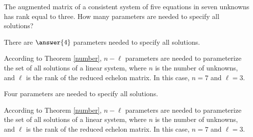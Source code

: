 \documentclass{ximera}
\begin{document}
\begin{exercise} \label{c2.4.2}
The augmented matrix of a consistent system of five equations in seven
unknowns has rank equal to three.  How many parameters are needed to
specify all solutions?
\begin{prompt}
  There are $\answer{4}$ parameters needed to specify all solutions.
\end{prompt}
\begin{hint}
  According to Theorem \ref{number}, $n - \ell$
parameters are needed to parameterize the set of all solutions of a
linear system, where $n$ is the number of unknowns, and $\ell$ is the
rank of the reduced echelon matrix.  In this case, $n = 7$ and $\ell =
3$.
\end{hint}

\begin{solution}

\ans Four parameters are needed to specify all solutions.

\soln According to Theorem \ref{number}, $n - \ell$
parameters are needed to parameterize the set of all solutions of a
linear system, where $n$ is the number of unknowns, and $\ell$ is the
rank of the reduced echelon matrix.  In this case, $n = 7$ and $\ell =
3$.

\end{solution}
\end{exercise}
\end{document}
